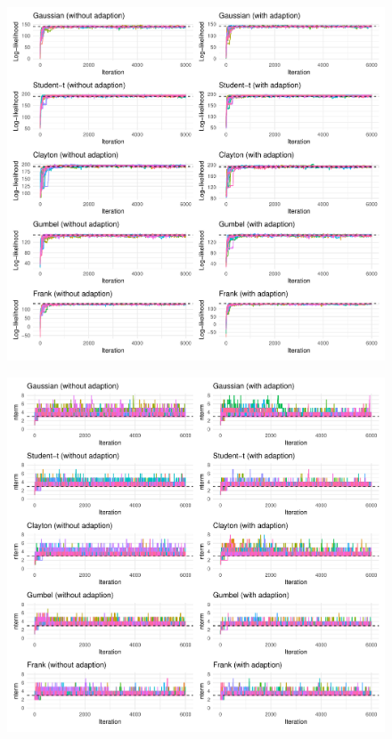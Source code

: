 \documentclass{amsart}
\begin{document}


\begin{figure}
	\centering
	\includegraphics[width = 0.95\linewidth]{"case_1_likelihood.pdf"}
\end{figure}

\begin{figure}
	\centering
	\includegraphics[width = 0.95\linewidth]{"case_1_nterm.pdf"}
\end{figure}
\end{document}
